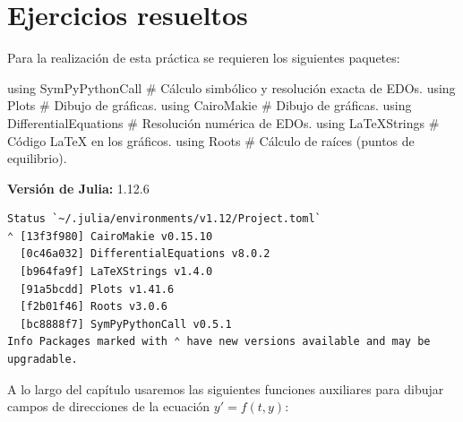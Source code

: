 \documentclass[
  spanish,
  a4paper,
]{scrreport}
\newenvironment{Shaded}{\begin{snugshade}}{\end{snugshade}}
\newcommand{\BuiltInTok}[1]{\textcolor[rgb]{0.00,0.23,0.31}{#1}}
\newcommand{\CommentTok}[1]{\textcolor[rgb]{0.37,0.37,0.37}{#1}}
\newcommand{\ImportTok}[1]{\textcolor[rgb]{0.00,0.46,0.62}{#1}}
\theoremstyle{definition}
\theoremstyle{remark}
\begin{document}
\section{Ejercicios resueltos}\label{ejercicios-resueltos}

Para la realización de esta práctica se requieren los siguientes
paquetes:

\begin{Shaded}
\begin{Highlighting}[]
\ImportTok{using} \BuiltInTok{SymPyPythonCall}         \CommentTok{\# Cálculo simbólico y resolución exacta de EDOs.}
\ImportTok{using} \BuiltInTok{Plots}                  \CommentTok{\# Dibujo de gráficas.}
\ImportTok{using} \BuiltInTok{CairoMakie}             \CommentTok{\# Dibujo de gráficas.}
\ImportTok{using} \BuiltInTok{DifferentialEquations}  \CommentTok{\# Resolución numérica de EDOs.}
\ImportTok{using} \BuiltInTok{LaTeXStrings}           \CommentTok{\# Código LaTeX en los gráficos.}
\ImportTok{using} \BuiltInTok{Roots}                  \CommentTok{\# Cálculo de raíces (puntos de equilibrio).}
\end{Highlighting}
\end{Shaded}

\begin{tcolorbox}[enhanced jigsaw, arc=.35mm, bottomrule=.15mm, bottomtitle=1mm, breakable, colback=white, colbacktitle=quarto-callout-note-color!10!white, colframe=quarto-callout-note-color-frame, coltitle=black, left=2mm, leftrule=.75mm, opacityback=0, opacitybacktitle=0.6, rightrule=.15mm, title=\textcolor{quarto-callout-note-color}{\faInfo}\hspace{0.5em}{Versiones de Julia y de los paquetes utilizados}, titlerule=0mm, toprule=.15mm, toptitle=1mm]

\textbf{Versión de Julia:} 1.12.6

\begin{verbatim}
Status `~/.julia/environments/v1.12/Project.toml`
⌃ [13f3f980] CairoMakie v0.15.10
  [0c46a032] DifferentialEquations v8.0.2
  [b964fa9f] LaTeXStrings v1.4.0
  [91a5bcdd] Plots v1.41.6
  [f2b01f46] Roots v3.0.6
  [bc8888f7] SymPyPythonCall v0.5.1
Info Packages marked with ⌃ have new versions available and may be upgradable.
\end{verbatim}

\end{tcolorbox}

A lo largo del capítulo usaremos las siguientes funciones auxiliares
para dibujar campos de direcciones de la ecuación \(y'=f(t,y)\):
\end{document}
